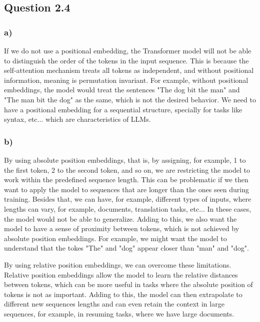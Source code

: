 \documentclass{article}
\begin{document}
\subsection*{Question 2.4}

\subsubsection*{a)}

If we do not use a positional embedding, the Transformer model will not be able to distinguish the order of the tokens in the
input sequence. This is because the self-attention mechanism treats all tokens as independent, and without positional information,
meaning is permutation invariant. For example, without positional embeddings, the model would treat the sentences "The dog bit the man"
and "The man bit the dog" as the same, which is not the desired behavior. We need to have a positional embedding
for a sequential structure, specially for tasks like syntax, etc... which are characteristics of LLMs.

\subsubsection*{b)}

By using absolute position embeddings, that is, by assigning, for example, 1 to the first token, 2 to the second token, and so on,
we are restricting the model to work within the predefined sequence length. This can be problematic if we then want to apply the model
to sequences that are longer than the ones seen during training. Besides that, we can have, for example, different types of inputs, 
where lengths can vary, for example, documents, translation tasks, etc... In these cases, the model would not be able to generalize.
Adding to this, we also want the model to have a sense of proximity between tokens, which is not achieved by absolute position embeddings.
For example, we might want the model to understand that the tokes "The" and "dog" appear closer than "man" and "dog".

By using relative position embeddings, we can overcome these limitations. Relative position embeddings allow the model to learn
the relative distances between tokens, which can be more useful in tasks where the absolute position of tokens is not as important.
Adding to this, the model can then extrapolate to different new sequences lengths and can even retain the context in large
sequences, for example, in resuming tasks, where we have large documents.
\end{document}
